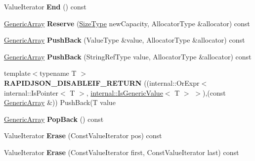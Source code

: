 \begin{DoxyCompactItemize}
\item 
Value\+Iterator {\bfseries End} () const \hypertarget{classGenericArray_aa75006f979b2d810e6ab0ff4f755cf32}{}\label{classGenericArray_aa75006f979b2d810e6ab0ff4f755cf32}

\item 
\hyperlink{classGenericArray}{Generic\+Array} {\bfseries Reserve} (\hyperlink{rapidjson_8h_a5ed6e6e67250fadbd041127e6386dcb5}{Size\+Type} new\+Capacity, Allocator\+Type \&allocator) const \hypertarget{classGenericArray_affe36316cbe3f80ece8a6fc45b777a58}{}\label{classGenericArray_affe36316cbe3f80ece8a6fc45b777a58}

\item 
\hyperlink{classGenericArray}{Generic\+Array} {\bfseries Push\+Back} (Value\+Type \&value, Allocator\+Type \&allocator) const \hypertarget{classGenericArray_a6aad4336bb87edc9113f34a6d9073d53}{}\label{classGenericArray_a6aad4336bb87edc9113f34a6d9073d53}

\item 
\hyperlink{classGenericArray}{Generic\+Array} {\bfseries Push\+Back} (String\+Ref\+Type value, Allocator\+Type \&allocator) const \hypertarget{classGenericArray_af583610a94a0fe360a5cbfd34fe8aa6c}{}\label{classGenericArray_af583610a94a0fe360a5cbfd34fe8aa6c}

\item 
{\footnotesize template$<$typename T $>$ }\\{\bfseries R\+A\+P\+I\+D\+J\+S\+O\+N\+\_\+\+D\+I\+S\+A\+B\+L\+E\+I\+F\+\_\+\+R\+E\+T\+U\+RN} ((internal\+::\+Or\+Expr$<$ internal\+::\+Is\+Pointer$<$ T $>$, \hyperlink{structinternal_1_1IsGenericValue}{internal\+::\+Is\+Generic\+Value}$<$ T $>$ $>$),(const \hyperlink{classGenericArray}{Generic\+Array} \&)) Push\+Back(T value\hypertarget{classGenericArray_a12adff0c1e11aa3be6f4160015a65df0}{}\label{classGenericArray_a12adff0c1e11aa3be6f4160015a65df0}

\item 
\hyperlink{classGenericArray}{Generic\+Array} {\bfseries Pop\+Back} () const \hypertarget{classGenericArray_a87a5a9acf7b26a81df42a54553bdbec4}{}\label{classGenericArray_a87a5a9acf7b26a81df42a54553bdbec4}

\item 
Value\+Iterator {\bfseries Erase} (Const\+Value\+Iterator pos) const \hypertarget{classGenericArray_a1d71be1384a0184514d9921d77b6a060}{}\label{classGenericArray_a1d71be1384a0184514d9921d77b6a060}

\item 
Value\+Iterator {\bfseries Erase} (Const\+Value\+Iterator first, Const\+Value\+Iterator last) const \hypertarget{classGenericArray_a105cb20275127cbd73fbc24e6af41dd1}{}\label{classGenericArray_a105cb20275127cbd73fbc24e6af41dd1}

\end{DoxyCompactItemize}
